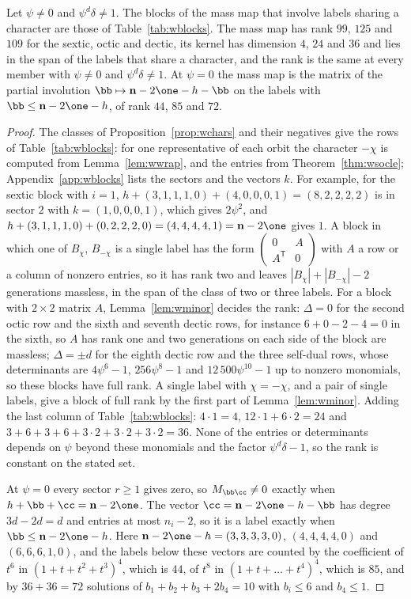 \begin{proposition}\label{prop:wmass}
Let $\psi\ne0$ and $\psi^d\delta\ne1$. The blocks of the mass map that
involve labels sharing a character are those of Table~\ref{tab:wblocks}.
The mass map has rank $99$, $125$ and $109$ for the sextic, octic and
dectic, its kernel has dimension $4$, $24$ and $36$ and lies in the span of
the labels that share a character, and the rank is the same at every member
with $\psi\ne0$ and $\psi^d\delta\ne1$. At $\psi=0$ the mass map is the
matrix of the partial involution $\bb\mapsto\mathbf n-2\one-h-\bb$ on the
labels with $\bb\le\mathbf n-2\one-h$, of rank $44$, $85$ and $72$.
\end{proposition}

\begin{proof}
The classes of Proposition~\ref{prop:wchars} and their negatives give the
rows of Table~\ref{tab:wblocks}: for one representative of each orbit the
character $-\chi$ is computed from Lemma~\ref{lem:wwrap}, and the entries
from Theorem~\ref{thm:wsocle}; Appendix~\ref{app:wblocks} lists the sectors
and the vectors $k$. For example, for the sextic block with $i=1$,
$h+(3,1,1,1,0)+(4,0,0,0,1)=(8,2,2,2,2)$ is in sector $2$ with
$k=(1,0,0,0,1)$, which gives $2\psi^2$, and $h+(3,1,1,1,0)+(0,2,2,2,0)=
(4,4,4,4,1)=\mathbf n-2\one$ gives $1$. A block in which one of $B_\chi$,
$B_{-\chi}$ is a single label has the form $\left(\begin{smallmatrix}0&A\\
A^{\mathsf T}&0\end{smallmatrix}\right)$ with $A$ a row or a column of
nonzero entries, so it has rank two and leaves $|B_\chi|+|B_{-\chi}|-2$
generations massless, in the span of the class of two or three labels. For
a block with $2\times2$ matrix $A$, Lemma~\ref{lem:wminor} decides the
rank: $\Delta=0$ for the second octic row and the sixth and seventh dectic
rows, for instance $6+0-2-4=0$ in the sixth, so $A$ has rank one and two
generations on each side of the block are massless; $\Delta=\pm d$ for the
eighth dectic row and the three self-dual rows, whose determinants are
$4\psi^6-1$, $256\psi^8-1$ and $12\,500\psi^{10}-1$ up to nonzero
monomials, so these blocks have full rank. A single label with
$\chi=-\chi$, and a pair of single labels, give a block of full rank by the
first part of Lemma~\ref{lem:wminor}. Adding the last column of
Table~\ref{tab:wblocks}: $4\cdot1=4$, $12\cdot1+6\cdot2=24$ and
$3+6+3+6+3\cdot2+3\cdot2+3\cdot2=36$. None of the entries or
determinants depends on $\psi$ beyond these monomials and the factor
$\psi^d\delta-1$, so the rank is constant on the stated set.

At $\psi=0$ every sector $r\ge1$ gives zero, so $M_{\bb\cc}\ne0$ exactly
when $h+\bb+\cc=\mathbf n-2\one$. The vector
$\cc=\mathbf n-2\one-h-\bb$ has degree $3d-2d=d$ and entries at most
$n_i-2$, so it is a label exactly when $\bb\le\mathbf n-2\one-h$. Here
$\mathbf n-2\one-h=(3,3,3,3,0)$, $(4,4,4,4,0)$ and $(6,6,6,1,0)$, and the
labels below these vectors are counted by the coefficient of $t^6$ in
$(1+t+t^2+t^3)^4$, which is $44$, of $t^8$ in $(1+t+\dots+t^4)^4$, which is
$85$, and by $36+36=72$ solutions of $b_1+b_2+b_3+2b_4=10$ with $b_i\le6$
and $b_4\le1$.
\end{proof}

